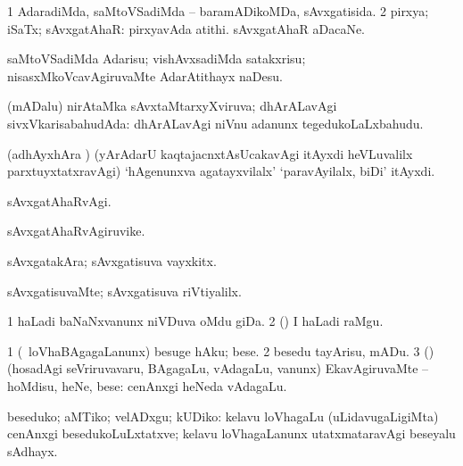 \bentry
{} 
\gl{\gu}
\bmng
\bnum
\num{1} AdaradiMda, saMtoVSadiMda -- baramADikoMDa, sAvxgatisida. 
\num{2} pirxya; iSaTx; sAvxgatAhaR:  pirxyavAda atithi.  sAvxgatAhaR aDacaNe. 
\enum
\emng

\noindent 
\gl{\pagu}
\expl{}
\bmng
{} saMtoVSadiMda Adarisu; vishAvxsadiMda satakxrisu; nisasxMkoVcavAgiruvaMte AdarAtithayx naDesu. 
\emng
\eentry

\bentry
{} 
\gl{\Agu}
\expl{}
\bmng
(mADalu) nirAtaMka sAvxtaMtarxyXviruva; dhArALavAgi sivxVkarisabahudAda:  dhArALavAgi niVnu adanunx tegedukoLaLxbahudu. 
\emng

\noindent 
\gl{\pagu}
\expl{}
\bmng
{} (adhAyxhAra \parx) (yArAdarU kaqtajacnxtAsUcakavAgi  itAyxdi heVLuvalilx parxtuyxtatxravAgi) `hAgenunxva agatayxvilalx' `paravAyilalx, biDi' itAyxdi. 
\emng
\eentry

\bentry 
{} 
\gl{\kirxvi}
\expl{}
\bmng
sAvxgatAhaRvAgi. 
\emng
\eentry

\bentry
{} 
\gl{\nA}
\expl{}
\bmng
sAvxgatAhaRvAgiruvike. 
\emng
\eentry

\bentry
{} 
\gl{\nA}
\expl{}
\bmng
sAvxgatakAra; sAvxgatisuva vayxkitx. 
\emng
\eentry

\bentry
{} 
\gl{\kirxvi}
\expl{}
\bmng
sAvxgatisuvaMte; sAvxgatisuva riVtiyalilx. 
\emng
\eentry

\bentry
{} 
\gl{\nA}
\expl{}
\bmng
\bnum
\num{1} haLadi baNaNxvanunx niVDuva oMdu giDa. 
\num{2} (\ca) I haLadi raMgu. 
\enum
\emng
\eentry

\bentry
{} 
\gl{\sakirx}
\expl{}
\bmng
\bnum
\num{1} (\kanmu\ loVhaBAgagaLanunx) besuge hAku; bese. 
\num{2} besedu tayArisu, mADu. 
\num{3} (\rUpa) (hosadAgi seVriruvavaru, BAgagaLu, vAdagaLu, \mo vanunx) EkavAgiruvaMte -- hoMdisu, heNe, bese:  cenAnxgi heNeda vAdagaLu. 
\enum
\emng

\noindent 
\gl{\akirx}
\expl{}
\bmng
beseduko; aMTiko; velADxgu; kUDiko:  kelavu loVhagaLu (uLidavugaLigiMta) cenAnxgi besedukoLuLxtatxve; kelavu loVhagaLanunx utatxmataravAgi beseyalu sAdhayx. 
\emng
\eentry

